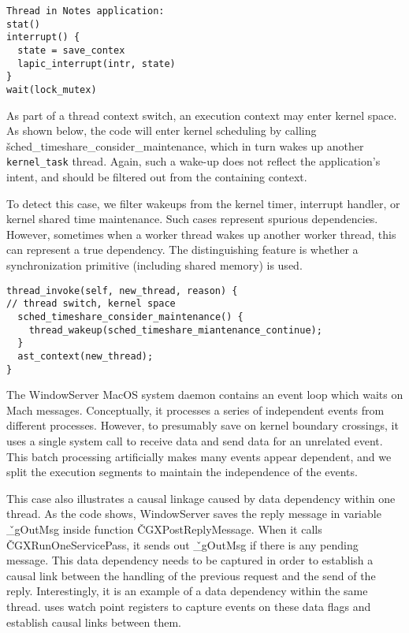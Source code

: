 {\footnotesize \begin{verbatim}
Thread in Notes application:
stat()
interrupt() {
  state = save_contex  
  lapic_interrupt(intr, state)
}
wait(lock_mutex)
\end{verbatim}
}

As part of a thread context switch, an execution context may enter kernel
space. As shown below, the code will enter kernel scheduling by calling
\v{sched\_timeshare\_consider\_maintenance}, which in turn wakes up another
\texttt{kernel\_task} thread.  Again, such a wake-up does not reflect the
application's intent, and should be filtered out from the containing context.  

To detect this case, we filter wakeups from the kernel timer, interrupt
handler, or kernel shared time maintenance. Such cases represent spurious
dependencies. However, sometimes when a worker thread wakes up another worker
thread, this can represent a true dependency. The distinguishing feature is
whether a synchronization primitive (including shared memory) is used.

{\footnotesize \begin{verbatim}
thread_invoke(self, new_thread, reason) {
// thread switch, kernel space
  sched_timeshare_consider_maintenance() {
    thread_wakeup(sched_timeshare_miantenance_continue);
  }
  ast_context(new_thread);
}
\end{verbatim}
}

The WindowServer MacOS system daemon contains an event loop which waits on Mach
messages. Conceptually, it processes a series of independent events from
different processes. However, to presumably save on kernel boundary crossings,
it uses a single system call to receive data and send data for an unrelated
event. This batch processing artificially makes many events appear dependent,
and we split the execution segments to maintain the independence of the events.

This case also illustrates a causal linkage caused by data dependency within
one thread.  As the code shows, WindowServer saves the reply message in
variable \v{\_gOutMsg} inside function \v{CGXPostReplyMessage}.  When it calls
\v{CGXRunOneServicePass}, it sends out \v{\_gOutMsg} if there is any pending
message.  This data dependency needs to be captured in order to establish a
causal link between the handling of the previous request and the send of the
reply.  Interestingly, it is an example of a data dependency within the same
thread.  \xxx uses watch point registers to capture events on these data flags
and establish causal links between them.

